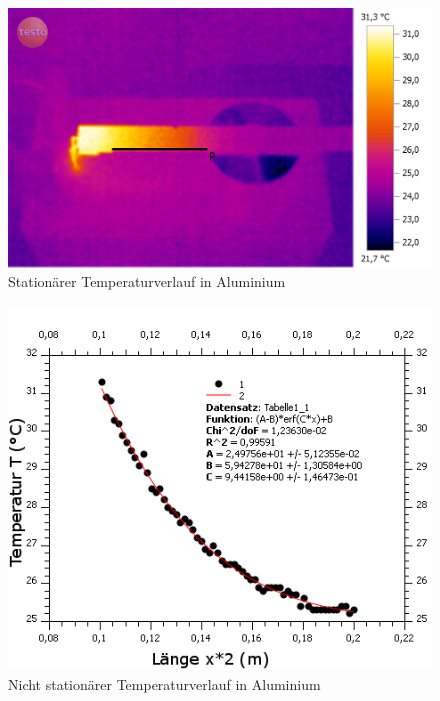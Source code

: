 \documentclass[12pt,a4paper]{article}
\begin{document}
\begin{multicols}{2}
\begin{figure}[H]
	\centering
	\includegraphics[scale=0.12]{./BilderCorrect/Versuch_1_stationaer_roh.png}
	\caption{Stationärer Temperaturverlauf in Aluminium}
	\label{fig:stat_verlauf}
\end{figure}

\end{multicols}
\begin{figure}[H]
	\centering
	\includegraphics[scale=7]{./BilderCorrect/nicht_stationaer_temp_verlauf.png}
	\caption{Nicht stationärer Temperaturverlauf in Aluminium }
	\label{fig:stat_verlauf}
\end{figure}
\end{document}
